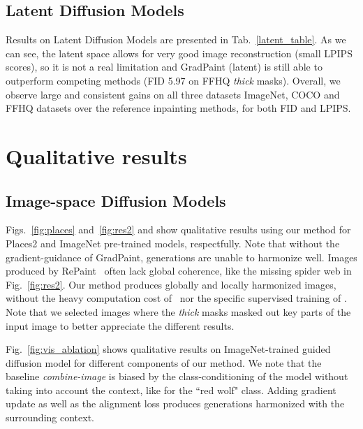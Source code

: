 \subsection{Latent Diffusion Models}

 Results on Latent Diffusion Models are presented in Tab.~\ref{latent_table}. As we can see, the latent space allows for very good image 
 reconstruction (small LPIPS scores), so it is not a real limitation and GradPaint (latent) is still able to outperform competing 
 methods (FID 5.97 on FFHQ \emph{thick} masks). Overall, we observe large and consistent gains on all three datasets ImageNet, 
 COCO and FFHQ datasets over the reference inpainting methods, for both FID and LPIPS.





\section{Qualitative results}

\subsection{Image-space Diffusion Models}

Figs.~\ref{fig:places} and~\ref{fig:res2} and  show qualitative results using our method for Places2 and ImageNet pre-trained models, 
respectfully. Note that without the gradient-guidance of GradPaint, generations are unable to harmonize well.
Images produced by RePaint~\citep{lugmayr2022repaint} often lack global coherence, like the missing spider web in Fig.~\ref{fig:res2}. 
Our method produces globally and locally harmonized images, without the heavy computation cost of~\cite{lugmayr2022repaint} nor the 
specific supervised training of \cite{lama}. Note that we selected images where the \textit{thick} masks masked out key parts 
of the input image to better appreciate the different results.

Fig.~\ref{fig:vis_ablation} shows qualitative results on ImageNet-trained 
 guided diffusion model for different components of our method. We note that the baseline \emph{combine-image} is
  biased by the class-conditioning of the model without taking into account the context, like for the ``red wolf" class. 
  Adding gradient update as well as the alignment loss produces generations harmonized with the surrounding context. 








